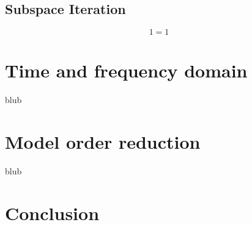 \documentclass[conference]{IEEEtran}
\begin{document}
\subsection*{Subspace Iteration}
\begin{equation}
1=1
\end{equation}






\section{Time and frequency domain}
blub
\section{Model order reduction}
blub
\section{Conclusion}
%
%

\end{document}

